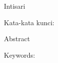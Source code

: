 \begin{abstractind}
    Intisari

    \bigskip
    Kata-kata kunci:
\end{abstractind}

\begin{abstracteng}
    Abstract

    \bigskip
    Keywords:
\end{abstracteng}
